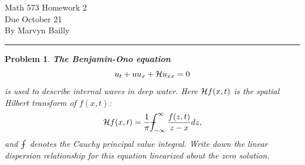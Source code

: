 \documentclass[12pt]{report}
\def\Xint#1{\mathchoice
   {\XXint\displaystyle\textstyle{#1}}%
   {\XXint\textstyle\scriptstyle{#1}}%
   {\XXint\scriptstyle\scriptscriptstyle{#1}}%
   {\XXint\scriptscriptstyle\scriptscriptstyle{#1}}%
   \!\int}
\def\XXint#1#2#3{{\setbox0=\hbox{$#1{#2#3}{\int}$}
     \vcenter{\hbox{$#2#3$}}\kern-.5\wd0}}
\def\dashint{\Xint-}
\newtheorem{problem}{Problem}
\def\dashint{\Xint-}
\begin{document}
\large

\begin{center}
 Math 573 Homework 2\\
 Due October 21\\
 By Marvyn Bailly\\
\end{center}

\normalsize

\hrule



\begin{problem}
    {\bf The Benjamin-Ono equation}
    \[
    u_t+u u_x+{\cal H}u_{xx}=0
    \]
    is used to describe internal waves in deep water. Here ${\cal H}f(x,t)$ is the spatial Hilbert transform of
    $f(x,t)$:
    \[
    {\cal H}f(x,t)=\frac{1}{\pi}\dashint_{-\infty}^\infty \frac{f(z,t)}{z-x}dz,
    \]
    and $\dashint$ denotes the Cauchy principal value integral. Write down the linear
    dispersion relationship for this equation linearized about the zero solution.
    
\end{problem}
\end{document}

